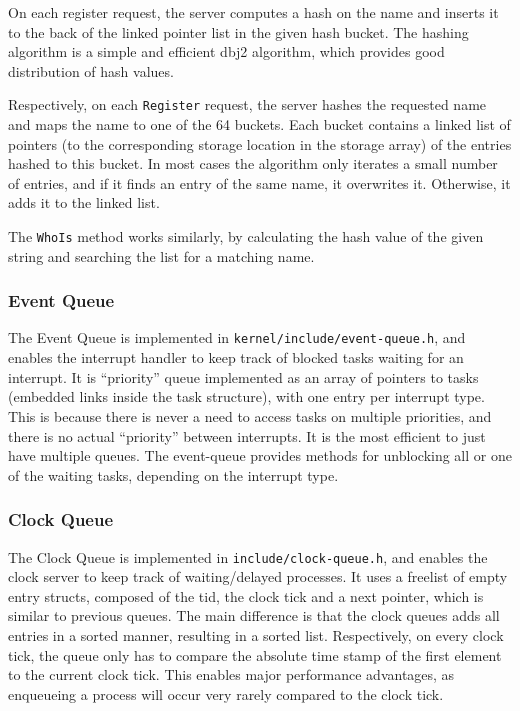 \documentclass[12pt, titlepage]{article}
\begin{document}
    On each register request, the server computes a hash on the name and inserts it to the back of the linked pointer list in the given hash bucket. The hashing algorithm is a simple and efficient dbj2 algorithm, which provides good distribution of hash values.

    Respectively, on each \verb`Register` request, the server hashes the requested name and maps the name to one of the 64 buckets.
    Each bucket contains a linked list of pointers (to the corresponding storage location in the storage array) of the entries hashed to this bucket. In most cases the algorithm only iterates a small number of entries, and if it finds an entry of the same name, it overwrites it. Otherwise, it adds it to the linked list.

    The \verb`WhoIs` method works similarly, by calculating the hash value of the given string and searching the list for a matching name.
    
    \subsubsection{Event Queue}
    \label{sec:event-queue}
    The Event Queue is implemented in \verb`kernel/include/event-queue.h`, and enables the interrupt handler to keep track of blocked tasks waiting for an interrupt. It is ``priority'' queue implemented as an array of pointers to tasks (embedded links inside the task structure), with one entry per interrupt type. This is because there is never a need to access tasks on multiple priorities, and there is no actual ``priority'' between interrupts. It is the most efficient to just have multiple queues. The event-queue provides methods for unblocking all or one of the waiting tasks, depending on the interrupt type.

    \subsubsection{Clock Queue}
    \label{sec:clock-queue}
    The Clock Queue is implemented in \verb`include/clock-queue.h`, and enables the clock server to keep track of waiting/delayed processes. 
    It uses a freelist of empty entry structs, composed of the tid, the clock tick and a next pointer, which is similar to previous queues. 
    The main difference is that the clock queues adds all entries in a sorted manner, resulting in a sorted list. 
    Respectively, on every clock tick, the queue only has to compare the absolute time stamp of the first element to the current clock tick. 
    This enables major performance advantages, as enqueueing a process will occur very rarely compared to the clock tick.   
\end{document}
